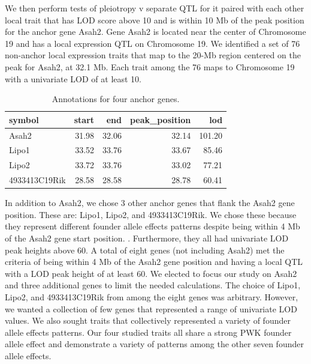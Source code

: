 \documentclass{article}
\begin{document}
We then perform tests of pleiotropy v separate QTL for it paired with each other local trait that has LOD score above 10 and is within 10 Mb of the peak position for the anchor gene Asah2.
Gene Asah2 is located near the center of Chromosome 19 and has a local expression QTL on Chromosome 19. We identified a set of 76 non-anchor local expression traits that map to the 20-Mb region centered on the peak for Asah2, at 32.1 Mb. Each trait among the 76 maps to Chromosome 19 with a univariate LOD of at least 10. 


\begin{table}[ht]
\centering
\begin{tabular}{lrrrr}
  \hline
symbol & start & end & peak\_position & lod \\ 
  \hline
Asah2 & 31.98 & 32.06 & 32.14 & 101.20 \\ 
  Lipo1 & 33.52 & 33.76 & 33.67 & 85.46 \\ 
  Lipo2 & 33.72 & 33.76 & 33.02 & 77.21 \\ 
  4933413C19Rik & 28.58 & 28.58 & 28.78 & 60.41 \\ 
   \hline
\end{tabular}
\caption{Annotations for four anchor genes.}\label{tab:ann4}
\end{table}




In addition to Asah2, we chose 3 other anchor genes that flank the Asah2 gene position. These are: Lipo1, Lipo2, and 4933413C19Rik. We chose these because they represent different founder allele effects patterns despite being within 4 Mb of the Asah2 gene start position.  . Furthermore, they all had univariate LOD peak heights above 60. A total of eight genes (not including Asah2) met the criteria of being within 4 Mb of the Asah2 gene position and having a local QTL with a LOD peak height of at least 60. We elected to focus our study on Asah2 and three additional genes to limit the needed calculations. The choice of Lipo1, Lipo2, and 4933413C19Rik from among the eight genes was arbitrary. However, we wanted a collection of few genes that represented a range of univariate LOD values. We also sought traits that collectively represented a variety of founder allele effects patterns. Our four studied traits all share a strong PWK founder allele effect and demonstrate a variety of patterns among the other seven founder allele effects. 
\end{document}
